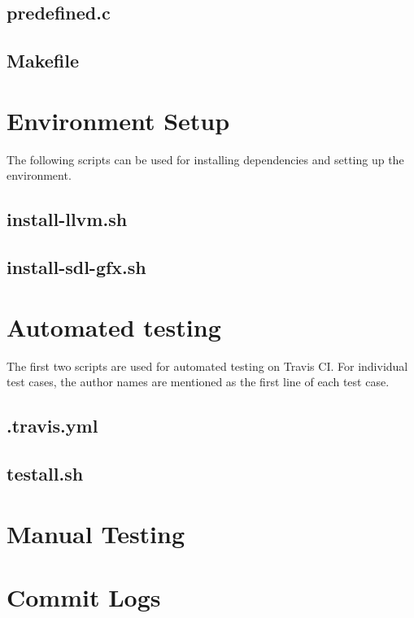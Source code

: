 \documentclass[letterpaper,12pt]{report}
\begin{document}
\begin{appendices}
    \section{predefined.c}
    

    \section{Makefile}
    


\chapter{Environment Setup}

The following scripts can be used for installing dependencies and setting up the environment.

    \section{install-llvm.sh}
    

    \section{install-sdl-gfx.sh}
    

\chapter{Automated testing}\label{test-suite}

The first two scripts are used for automated testing on Travis CI. For individual test cases, the author names are mentioned as the first line of each test case.

    \section{.travis.yml}
    

    \section{testall.sh}
    

    

\chapter{Manual Testing}\label{mnl-test}

  

\chapter{Commit Logs} \label{git:log}
  

\end{appendices}
\end{document}
